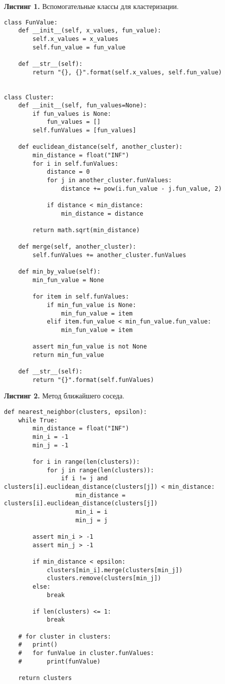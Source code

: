 \documentclass[a4paper, 12pt]{article}   	%
\begin{document}
    \textbf{Листинг 1.} Вспомогательные классы для кластеризации.
    \begin{verbatim}
class FunValue:
	def __init__(self, x_values, fun_value):
		self.x_values = x_values
		self.fun_value = fun_value

	def __str__(self):
		return "{}, {}".format(self.x_values, self.fun_value)


class Cluster:
	def __init__(self, fun_values=None):
		if fun_values is None:
			fun_values = []
		self.funValues = [fun_values]

	def euclidean_distance(self, another_cluster):
		min_distance = float("INF")
		for i in self.funValues:
			distance = 0
			for j in another_cluster.funValues:
				distance += pow(i.fun_value - j.fun_value, 2)

			if distance < min_distance:
				min_distance = distance

		return math.sqrt(min_distance)

	def merge(self, another_cluster):
		self.funValues += another_cluster.funValues

	def min_by_value(self):
		min_fun_value = None

		for item in self.funValues:
			if min_fun_value is None:
				min_fun_value = item
			elif item.fun_value < min_fun_value.fun_value:
				min_fun_value = item

		assert min_fun_value is not None
		return min_fun_value

	def __str__(self):
		return "{}".format(self.funValues)
    \end{verbatim}

    \textbf{Листинг 2.} Метод ближайшего соседа.
    \begin{verbatim}
def nearest_neighbor(clusters, epsilon):
	while True:
		min_distance = float("INF")
		min_i = -1
		min_j = -1

		for i in range(len(clusters)):
			for j in range(len(clusters)):
				if i != j and clusters[i].euclidean_distance(clusters[j]) < min_distance:
					min_distance = clusters[i].euclidean_distance(clusters[j])
					min_i = i
					min_j = j

		assert min_i > -1
		assert min_j > -1

		if min_distance < epsilon:
			clusters[min_i].merge(clusters[min_j])
			clusters.remove(clusters[min_j])
		else:
			break

		if len(clusters) <= 1:
			break

	# for cluster in clusters:
	# 	print()
	# 	for funValue in cluster.funValues:
	# 		print(funValue)

	return clusters
    \end{verbatim}
\end{document}
